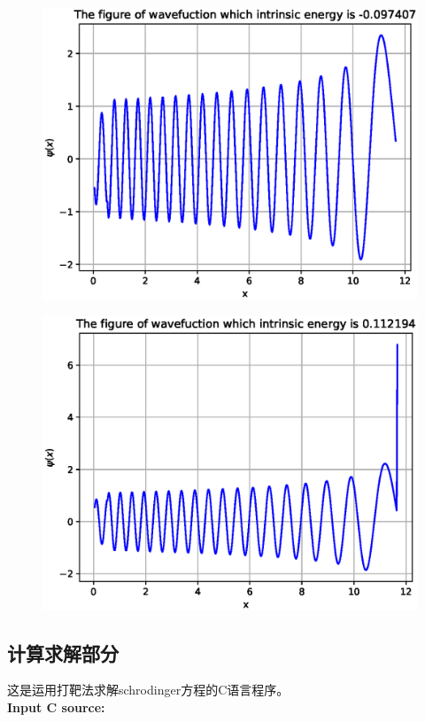 \documentclass[twoside,twocolumn]{article}
\begin{document}
\begin{CJK*}{UTF8}{gkai}
\begin{figure}
	\label{fig:34}
\end{figure}
\begin{figure}
	\centering
	\includegraphics[width=0.9\linewidth]{figure/35}
	\label{fig:35}
\end{figure}
\begin{figure}
	\centering
	\includegraphics[width=0.9\linewidth]{figure/36}
	\label{fig:36}
\end{figure}


\newpage
\onecolumn
\begin{appendices}
\section{计算求解部分}
这是运用打靶法求解schrodinger方程的C语言程序。\\
\textbf{\textcolor[rgb]{0.98,0.00,0.00}{Input C source:}}


\end{appendices}
\end{CJK*}
\end{document}
